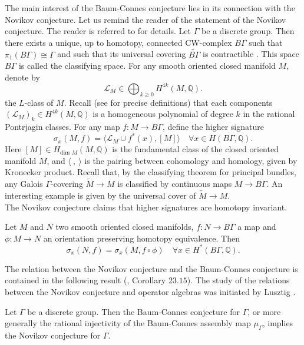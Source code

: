 The main interest of the Baum-Connes conjecture lies in its connection with the Novikov conjecture. Let us remind the reader of the statement of the Novikov conjecture. The reader is referred to \cite{kreckluck} for details. Let $\Gamma$ be a discrete group. Then there exists a unique, up to homotopy, connected CW-complex $B\Gamma$ such that $\pi_1(B \Gamma) \cong \Gamma$ and such that its universal covering $\tilde{B\Gamma}$ is contractible \cite{May}. This space $B\Gamma$ is called the classifying space. For any smooth oriented closed manifold $M$, denote by \[\mathcal L_M \in \bigoplus_{k\geq 0} H^{4k}(M,\mathbb Q).\] the $L$-class of $M$. Recall (see \cite{kreckluck} for precise definitions) that each components $(\mathcal L_M)_k\in H^{4k}(M,\mathbb Q) $ is a homogeneous polynomial of degree $k$ in the rational Pontrjagin classes. For any map $f: M\rightarrow B\Gamma$, define the higher signature 
\[\sigma_x(M,f) = \langle \mathcal L_M \cup f^*(x),[M] \rangle \quad \forall x\in H(B\Gamma,\mathbb Q).\]
Here $[M]\in H_{\text{dim }M}(M,\mathbb Q)$ is the fundamental class of the closed oriented manifold $M$, and $\langle \ , \ \rangle $ is the pairing between cohomology and homology, given by Kronecker product. Recall that, by the classifying theorem for principal bundles, any Galois $\Gamma$-covering $\tilde M \rightarrow M $ is classified by continuous maps $M\rightarrow B\Gamma$. An interesting example is given by the universal cover of $\tilde M\rightarrow M$.\\

The Novikov conjecture claims that higher signatures are homotopy invariant.

\begin{conj}[Novikov]\label{Novikov}
Let $M$ and $N$ two smooth oriented closed manifolds, $f: N\rightarrow B\Gamma$ a map and $\phi : M\rightarrow N$ an orientation preserving homotopy equivalence. Then 
\[\sigma_x(N,f)= \sigma_x(M,f\circ\phi )\quad \forall x\in H^*(B\Gamma,\mathbb Q).\]
\end{conj}

The relation between the Novikov conjecture and the Baum-Connes conjecture is contained in the following result (\cite{kreckluck}, Corollary $23.15$). The study of the relations between the Novikov conjecture and operator algebras was initiated by Lusztig \cite{lusztig}. 

\begin{thm}
Let $\Gamma$ be a discrete group. Then the Baum-Connes conjecture for $\Gamma$, or more generally the rational injectivity of the Baum-Connes assembly map $\mu_\Gamma$, implies the Novikov conjecture for $\Gamma$.
\end{thm}

